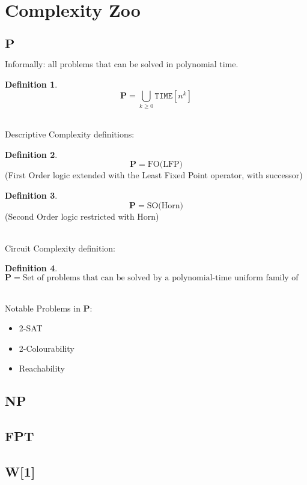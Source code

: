 \documentclass[]{article}
\theoremstyle{definition}
\newtheorem{definition}{Definition}[section]
\begin{document}
	
\section{Complexity Zoo}

\subsection{$\mathbf{P}$}
\label{sec:P}
Informally: all problems that can be solved in polynomial time.
\begin{definition}
	$$\mathbf{P} = \bigcup_{k\geq 0} \mathtt{TIME}[n^{k}]$$
\end{definition}
$ $
\\
\\
Descriptive Complexity definitions: 
\begin{definition}
	$$\mathbf{P} = \text{FO(LFP)}$$
(First Order logic extended with the Least Fixed Point operator, with successor)
\end{definition}
\begin{definition}
	$$\mathbf{P} = \text{SO(Horn)}$$
(Second Order logic restricted with Horn)
\end{definition}
$ $
\\
\\
Circuit Complexity definition:
\begin{definition}
	$$\mathbf{P} = \text{Set of problems that can be solved by a polynomial-time uniform family of boolean circuits}$$
\end{definition}
$ $
\\
\\
Notable Problems in $\mathbf{P}$:
\begin{itemize}
	\item 2-SAT
	\item 2-Colourability
	\item Reachability
\end{itemize}
\subsection{NP}

\subsection{FPT}

\subsection{W[1]}
\end{document}
